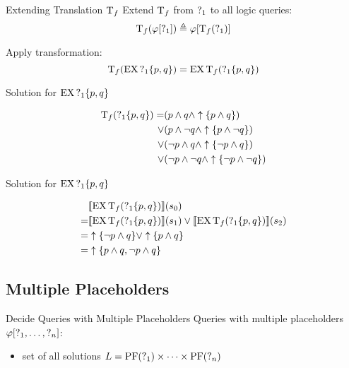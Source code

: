 \begin{frame}{Extending Translation $\operatorname{T}_f$}
  Extend $\operatorname{T}_f$ from $\operatorname{?}_1$ to all logic queries:
  \[ 
    \operatorname{T}_f(\varphi[\operatorname{?}_1]) \triangleq \varphi[\operatorname{T}_f(\operatorname{?}_1)]
  \]
  
  \begin{example}
    Apply transformation:
    \[ \operatorname{T}_f(\operatorname{EX} \operatorname{?}_1\{p,q\}) = \operatorname{EX}\operatorname{T}_f( \operatorname{?}_1\{p,q\}) \]
  \end{example}
\end{frame}

\begin{frame}{Solution for $\operatorname{EX} \operatorname{?}_1\{p,q\}$}
  \begin{example}
    \begin{align*}
      \operatorname{T}_f( \operatorname{?}_1\{p,q\}) 
        =   &(p \land q \land \uparrow\{p\land q\}) \\
        \lor&(p \land \lnot q \land \uparrow\{p\land \lnot q\}) \\
        \lor&(\lnot p \land q \land \uparrow\{\lnot p\land q\}) \\
        \lor&(\lnot p \land \lnot q \land \uparrow\{\lnot p\land \lnot q\})
    \end{align*}
  \end{example}
\end{frame}

\begin{frame}{Solution for $\operatorname{EX} \operatorname{?}_1\{p,q\}$}
  \begin{example}
    \begin{align*}
      & \llbracket \operatorname{EX} \operatorname{T}_f( \operatorname{?}_1\{p,q\}) \rrbracket (s_0) \\
        =& \llbracket \operatorname{EX} \operatorname{T}_f( \operatorname{?}_1\{p,q\}) \rrbracket (s_1) \lor \llbracket \operatorname{EX} \operatorname{T}_f( \operatorname{?}_1\{p,q\}) \rrbracket (s_2) \\
        =& \uparrow\{\lnot p\land q\} \lor \uparrow\{p\land q\} \\
        =& \uparrow\{p\land q, \lnot p\land q\} 
    \end{align*}
  \end{example}
\end{frame}

\subsection{Multiple Placeholders}%

\begin{frame}{Decide Queries with Multiple Placeholders}
  Queries with multiple placeholders $\varphi[\operatorname{?}_1,\ldots,\operatorname{?}_n]$:
  \begin{itemize}
    \item set of all solutions $L = \operatorname{PF}(\operatorname{?}_1)\times \cdots \times \operatorname{PF}(\operatorname{?}_n)$
  \end{itemize}
\end{frame}

